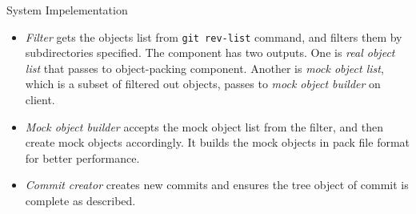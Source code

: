 \documentclass[final]{beamer}
\begin{document}
\begin{frame}[t, fragile]
\begin{columns}[t]
\begin{column}{.5\linewidth}
\begin{block}{System Impelementation}
\begin{itemize}
  \item \emph{Filter} gets the objects list from
    \verb|git rev-list| command, and filters them by subdirectories specified.
    The component has two outputs.
    One is \emph{real object list} that passes to object-packing component.
    Another is \emph{mock object list}, which is a subset of filtered out
    objects, passes to \emph{mock object builder} on client.

  \item \emph{Mock object builder} accepts the mock object list
    from the filter, and then create mock objects accordingly.
    It builds the mock objects in pack file format for better
    performance.

  \item \emph{Commit creator} creates new commits and ensures
    the tree object of commit is complete as described.
\end{itemize}
      \end{block}
    \end{column}
  \end{columns}
\end{frame}
\end{document}
